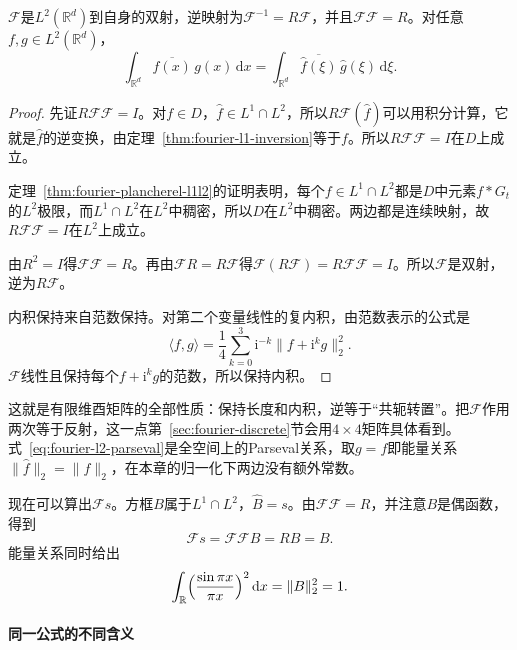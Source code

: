 \begin{theorem}[$L^2$反演与Parseval关系]
\label{thm:fourier-l2-inversion}
$\mathcal F$是$L^2(\mathbb R^d)$到自身的双射，逆映射为$\mathcal F^{-1}=R\mathcal F$，并且$\mathcal F\mathcal F=R$。对任意$f,g\in L^2(\mathbb R^d)$，
\begin{equation}
\int_{\mathbb R^d}\overline{f(x)}\,g(x)\,\mathrm dx=\int_{\mathbb R^d}\overline{\widehat f(\xi)}\,\widehat g(\xi)\,\mathrm d\xi .
\label{eq:fourier-l2-parseval}
\end{equation}
\end{theorem}

\begin{proof}
先证$R\mathcal F\mathcal F=I$。对$f\in D$，$\widehat f\in L^1\cap L^2$，所以$R\mathcal F(\widehat f)$可以用积分计算，它就是$\widehat f$的逆变换，由定理~\ref{thm:fourier-l1-inversion}等于$f$。所以$R\mathcal F\mathcal F=I$在$D$上成立。

定理~\ref{thm:fourier-plancherel-l1l2}的证明表明，每个$f\in L^1\cap L^2$都是$D$中元素$f*G_t$的$L^2$极限，而$L^1\cap L^2$在$L^2$中稠密，所以$D$在$L^2$中稠密。两边都是连续映射，故$R\mathcal F\mathcal F=I$在$L^2$上成立。

由$R^2=I$得$\mathcal F\mathcal F=R$。再由$\mathcal FR=R\mathcal F$得$\mathcal F(R\mathcal F)=R\mathcal F\mathcal F=I$。所以$\mathcal F$是双射，逆为$R\mathcal F$。

内积保持来自范数保持。对第二个变量线性的复内积，由范数表示的公式是
\[
\langle f,g\rangle=\frac14\sum_{k=0}^3\mathrm i^{-k}\lVert f+\mathrm i^kg\rVert_2^2.
\]
$\mathcal F$线性且保持每个$f+\mathrm i^kg$的范数，所以保持内积。
\end{proof}

这就是有限维酉矩阵的全部性质：保持长度和内积，逆等于“共轭转置”。把$\mathcal F$作用两次等于反射，这一点第~\ref{sec:fourier-discrete}节会用$4\times4$矩阵具体看到。式~\eqref{eq:fourier-l2-parseval}是全空间上的Parseval关系，取$g=f$即能量关系$\lVert\widehat f\rVert_2=\lVert f\rVert_2$，在本章的归一化下两边没有额外常数。

现在可以算出$\mathcal Fs$。方框$B$属于$L^1\cap L^2$，$\widehat B=s$。由$\mathcal F\mathcal F=R$，并注意$B$是偶函数，得到
\[
\mathcal Fs=\mathcal F\mathcal FB=RB=B.
\]
能量关系同时给出
\[
\int_{\mathbb R}\Bigl(\frac{\sin\pi x}{\pi x}\Bigr)^2\,\mathrm dx=\lVert B\rVert_2^2=1.
\]

\paragraph{同一公式的不同含义}

